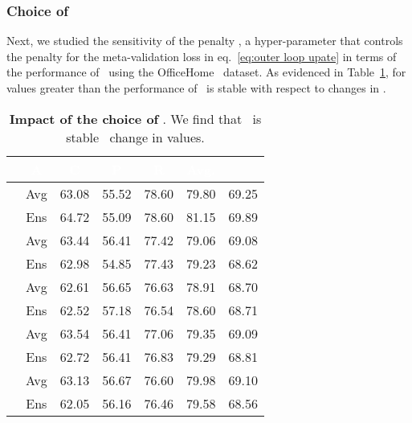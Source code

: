 \subsubsection{Choice of }
Next, we studied the sensitivity of the penalty , a hyper-parameter that controls the penalty for the meta-validation loss in eq.~\eqref{eq:outer loop upate} in terms of the performance of \muld~using the OfficeHome~\citep{officehome} dataset. As evidenced in Table~\ref{tab:eta}, for values greater than  the performance of \muld~is stable with respect to changes in .

\begin{table}[t]
    \centering
    \caption{\textbf{Impact of the choice of }. We find that \muld~is stable \wrt~change in  values.}
    \label{tab:eta}
    \renewcommand{\arraystretch}{1.2}
\begin{tabular}{|c|c|c|c|c|c|c|}
    \hline
    \rowcolor[HTML]{404040}
    \multicolumn{2}{|c|}{\textcolor{white}{Choice of }}  & \textcolor{white}{A}          & \textcolor{white}{C}          & \textcolor{white}{P}          & \textcolor{white}{R}      & \textcolor{white}{Avg.}  \\
    \hline
    \hline
    \multirow{2}{*}{  } & Avg & 63.08 & 55.52 & 78.60 & 79.80 & 69.25 \\
    & Ens & 64.72 & 55.09 & 78.60 & 81.15 & 69.89 \\\hline
    \multirow{2}{*}{   } & Avg & 63.44 & 56.41 & 77.42 & 79.06 & 69.08 \\
    & Ens & 62.98 & 54.85 & 77.43 & 79.23 & 68.62 \\\hline
    \multirow{2}{*}{  } & Avg & 62.61 & 56.65 & 76.63 & 78.91 & 68.70 \\
    & Ens & 62.52 & 57.18 & 76.54 & 78.60 & 68.71 \\\hline
    \multirow{2}{*}{   } & Avg & 63.54 & 56.41 & 77.06 & 79.35 & 69.09 \\
    & Ens & 62.72 & 56.41 & 76.83 & 79.29 & 68.81 \\\hline
    \multirow{2}{*}{   } & Avg & 63.13 & 56.67 & 76.60 & 79.98 & 69.10 \\
    & Ens & 62.05 & 56.16 & 76.46 & 79.58 & 68.56 \\\hline
    \end{tabular}
\end{table}




